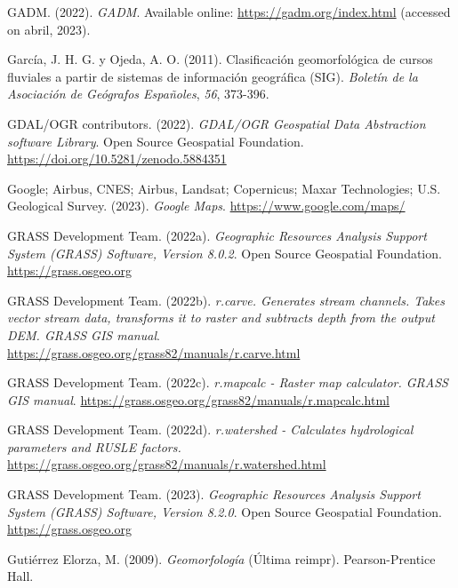 \documentclass[spanish]{article}
\newlength{\cslhangindent}
\newlength{\cslentryspacingunit} %
\newenvironment{CSLReferences}[2] %
 {%
  \setlength{\parindent}{0pt}
  \ifodd #1
  \let\oldpar\par
  \def\par{\hangindent=\cslhangindent\oldpar}
  \fi
  \setlength{\parskip}{#2\cslentryspacingunit}
 }%
 {}
\begin{document}
\begin{CSLReferences}{1}{0}
\leavevmode{}%
GADM. (2022). \emph{{GADM}}. Available online:
\url{https://gadm.org/index.html} (accessed on abril, 2023).

\leavevmode{}%
García, J. H. G. y Ojeda, A. O. (2011). Clasificación geomorfológica de
cursos fluviales a partir de sistemas de información geográfica (SIG).
\emph{Boletín de la Asociación de Geógrafos Españoles}, \emph{56},
373-396.

\leavevmode{}%
GDAL/OGR contributors. (2022). \emph{{GDAL/OGR} Geospatial Data
Abstraction software Library}. Open Source Geospatial Foundation.
\url{https://doi.org/10.5281/zenodo.5884351}

\leavevmode{}%
Google; Airbus, CNES; Airbus, Landsat; Copernicus; Maxar Technologies;
U.S. Geological Survey. (2023). \emph{Google Maps}.
\url{https://www.google.com/maps/}

\leavevmode{}%
GRASS Development Team. (2022a). \emph{Geographic Resources Analysis
Support System (GRASS) Software, Version 8.0.2}. Open Source Geospatial
Foundation. \url{https://grass.osgeo.org}

\leavevmode{}%
GRASS Development Team. (2022b). \emph{r.carve. Generates stream
channels. Takes vector stream data, transforms it to raster and
subtracts depth from the output DEM. GRASS GIS manual}.
\url{https://grass.osgeo.org/grass82/manuals/r.carve.html}

\leavevmode{}%
GRASS Development Team. (2022c). \emph{r.mapcalc - Raster map
calculator. GRASS GIS manual}.
\url{https://grass.osgeo.org/grass82/manuals/r.mapcalc.html}

\leavevmode{}%
GRASS Development Team. (2022d). \emph{r.watershed - Calculates
hydrological parameters and RUSLE factors.}
\url{https://grass.osgeo.org/grass82/manuals/r.watershed.html}

\leavevmode{}%
GRASS Development Team. (2023). \emph{Geographic Resources Analysis
Support System (GRASS) Software, Version 8.2.0}. Open Source Geospatial
Foundation. \url{https://grass.osgeo.org}

\leavevmode{}%
Gutiérrez Elorza, M. (2009). \emph{Geomorfología} (Última reimpr).
Pearson-Prentice Hall.


\end{CSLReferences}
\end{document}
